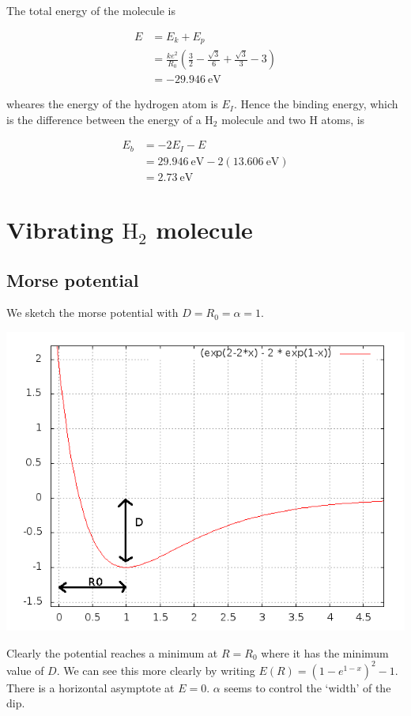 \documentclass{article}
\begin{document}
The total energy of the molecule is

\begin{align*}
E &= E_k + E_p \\
&= \frac{ke^2}{R_0} \left(\frac{3}{2} - \frac{\sqrt 3}{6} + \frac{\sqrt 3}{3} - 3\right) \\
&= -29.946\mathrm{\ eV}
\end{align*}

wheares the energy of the hydrogen atom is $E_I$. Hence the binding energy, which is the difference between the energy of a $\mathrm{H_2}$ molecule and two H atoms, is

\begin{align*}
E_b &= -2 E_I - E \\
&= 29.946\mathrm{\ eV} - 2(13.606\mathrm{\ eV}) \\
&= 2.73\mathrm{\ eV}
\end{align*}

\section{Vibrating $\mathrm{H_2}$ molecule}

\subsection{Morse potential}

We sketch the morse potential with $D=R_0=\alpha=1$.

\includegraphics[width=\textwidth]{morse.png}

Clearly the potential reaches a minimum at $R = R_0$ where it has the minimum value of $D$. We can see this more clearly by writing $E(R) = (1 - e^{1-x})^2 - 1$. There is a horizontal asymptote at $E = 0$. $\alpha$ seems to control the `width' of the dip.
\end{document}
